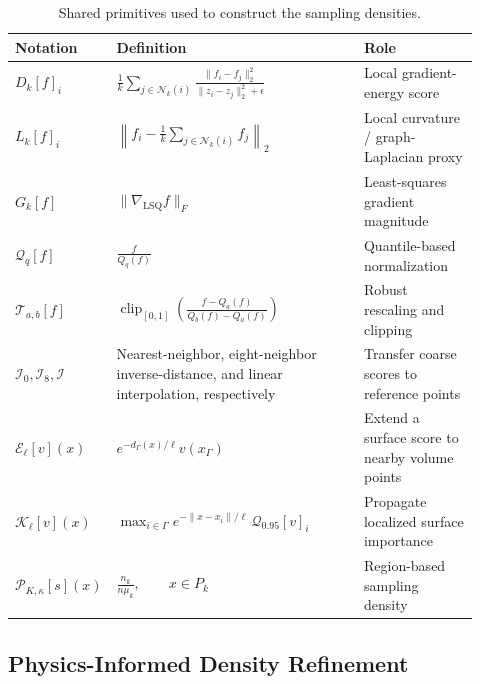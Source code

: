 \documentclass{article}
\begin{document}
\begin{table}[t]
\centering
\caption{Shared primitives used to construct the sampling densities.}
\label{tab:density_primitives}
\small
\begin{tabular}{@{}p{0.13\linewidth} p{0.54\linewidth} p{0.25\linewidth}@{}}
\toprule
Notation & Definition & Role \\
\midrule

$D_k[f]_i$
&
$\displaystyle
\frac{1}{k}\sum_{j\in\mathcal N_k(i)}
\frac{\|f_i-f_j\|_2^2}{\|z_i-z_j\|_2^2+\epsilon}
$
&
Local gradient-energy score
\\[1.2em]

$L_k[f]_i$
&
$\displaystyle
\left\|
f_i-\frac{1}{k}\sum_{j\in\mathcal N_k(i)}f_j
\right\|_2
$
&
Local curvature / graph-Laplacian proxy
\\[1.2em]

$G_k[f]$
&
$\displaystyle
\|\nabla_{\mathrm{LSQ}}f\|_F
$
&
Least-squares gradient magnitude
\\[0.8em]

$\mathcal Q_q[f]$
&
$\displaystyle
\frac{f}{Q_q(f)}
$
&
Quantile-based normalization
\\[1em]

$\mathcal T_{a,b}[f]$
&
$\displaystyle
\operatorname{clip}_{[0,1]}
\left(
\frac{f-Q_a(f)}{Q_b(f)-Q_a(f)}
\right)
$
&
Robust rescaling and clipping
\\[1.2em]

$\mathcal I_0,\mathcal I_8,\mathcal I$
&
Nearest-neighbor, eight-neighbor inverse-distance,
and linear interpolation, respectively
&
Transfer coarse scores to reference points
\\[0.8em]

$\mathcal E_\ell[v](x)$
&
$\displaystyle
e^{-d_\Gamma(x)/\ell}v(x_\Gamma)
$
&
Extend a surface score to nearby volume points
\\[1em]

$\mathcal K_\ell[v](x)$
&
$\displaystyle
\max_{i\in\Gamma}
e^{-\|x-x_i\|/\ell}\,
\mathcal Q_{0.95}[v]_i
$
&
Propagate localized surface importance
\\[1.2em]

$\mathcal P_{K,\kappa}[s](x)$
&
$\displaystyle
\frac{n_k}{n\mu_k},
\qquad x\in P_k
$
&
Region-based sampling density
\\

\bottomrule
\end{tabular}
\end{table}
\subsection{Physics-Informed Density Refinement}
\label{app:pi_density_design}
\end{document}
